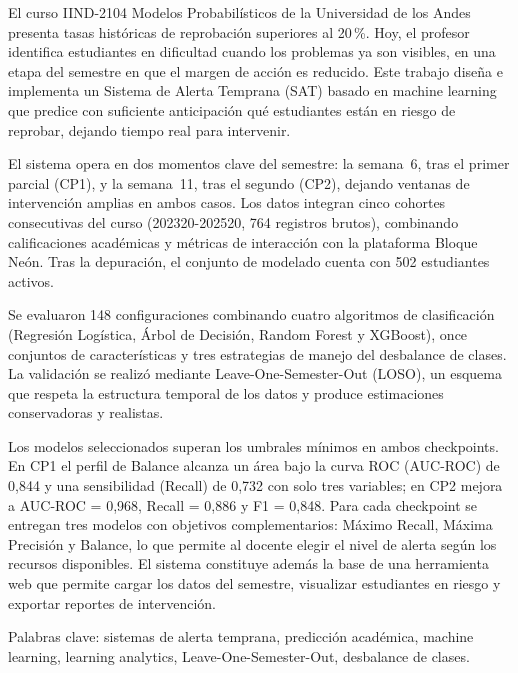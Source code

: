 \documentclass[12pt, letterpaper, openany]{report}
\begin{document}
El curso IIND-2104 Modelos Probabilísticos de la Universidad de los Andes 
presenta tasas históricas de reprobación superiores al 20\,\%. Hoy, el  profesor identifica estudiantes en dificultad cuando los problemas ya son visibles, en una etapa del semestre en que el margen de acción es 
reducido. Este trabajo diseña e implementa un Sistema de Alerta Temprana (SAT) basado en machine learning que predice con suficiente anticipación qué estudiantes están en riesgo de reprobar, dejando tiempo real para intervenir.


El sistema opera en dos momentos clave del semestre: la semana~6, 
tras el primer parcial (CP1), y la semana~11, tras el segundo (CP2), 
dejando ventanas de intervención amplias en ambos casos. Los datos 
integran cinco cohortes consecutivas del curso (202320-202520, 764 registros brutos), combinando calificaciones académicas y métricas de interacción con la plataforma Bloque Neón. Tras la depuración, el conjunto de modelado cuenta con 502 estudiantes activos.

Se evaluaron 148 configuraciones combinando cuatro algoritmos de 
clasificación (Regresión Logística, Árbol de Decisión, Random Forest 
y XGBoost), once conjuntos de características y tres estrategias de 
manejo del desbalance de clases. La validación se realizó mediante 
Leave-One-Semester-Out (LOSO), un esquema que respeta la estructura 
temporal de los datos y produce estimaciones conservadoras y realistas.

Los modelos seleccionados superan los umbrales mínimos en ambos 
checkpoints. En CP1 el perfil de Balance alcanza un área bajo la curva 
ROC (AUC-ROC) de 0,844 y una sensibilidad (Recall) de 0,732 con solo 
tres variables; en CP2 mejora a AUC-ROC = 0,968, Recall = 0,886 y 
F1 = 0,848. Para cada checkpoint se entregan tres modelos con objetivos 
complementarios: Máximo Recall, Máxima Precisión y Balance, lo que 
permite al docente elegir el nivel de alerta según los recursos 
disponibles. El sistema constituye además la base de una herramienta 
web que permite cargar los datos del semestre, visualizar estudiantes 
en riesgo y exportar reportes de intervención.

\vspace{0.8cm}
\noindent Palabras clave: sistemas de alerta temprana, predicción académica, machine learning, learning analytics, Leave-One-Semester-Out, desbalance de clases.

\hypersetup{pageanchor=false}
\tableofcontents
\listoffigures
\listoftables
\end{document}
